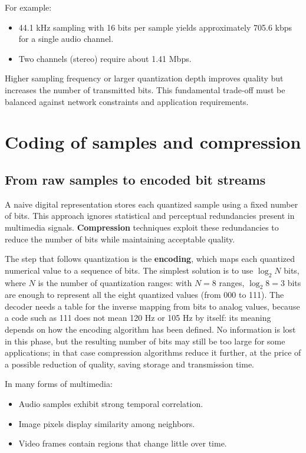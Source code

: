 \documentclass[11pt,a4paper,openany]{report}
\begin{document}
For example:

\begin{itemize}
\item 44.1 kHz sampling with 16 bits per sample yields approximately 705.6 kbps for a single audio channel.
\item Two channels (stereo) require about 1.41 Mbps.
\end{itemize}

Higher sampling frequency or larger quantization depth improves quality but increases the number of transmitted bits. This fundamental trade-off must be balanced against network constraints and application requirements.

\section{Coding of samples and compression}

\subsection{From raw samples to encoded bit streams}

A naive digital representation stores each quantized sample using a fixed number of bits. This approach ignores statistical and perceptual redundancies present in multimedia signals. \textbf{Compression} techniques exploit these redundancies to reduce the number of bits while maintaining acceptable quality.


The step that follows quantization is the \textbf{encoding}, which maps each quantized numerical value to a sequence of bits. The simplest solution is to use $\log_2 N$ bits, where $N$ is the number of quantization ranges: with $N = 8$ ranges, $\log_2 8 = 3$ bits are enough to represent all the eight quantized values (from 000 to 111). The decoder needs a table for the inverse mapping from bits to analog values, because a code such as 111 does not mean 120 Hz or 105 Hz by itself: its meaning depends on how the encoding algorithm has been defined. No information is lost in this phase, but the resulting number of bits may still be too large for some applications; in that case compression algorithms reduce it further, at the price of a possible reduction of quality, saving storage and transmission time.

In many forms of multimedia:

\begin{itemize}
\item Audio samples exhibit strong temporal correlation.
\item Image pixels display similarity among neighbors.
\item Video frames contain regions that change little over time.
\end{itemize}
\end{document}
